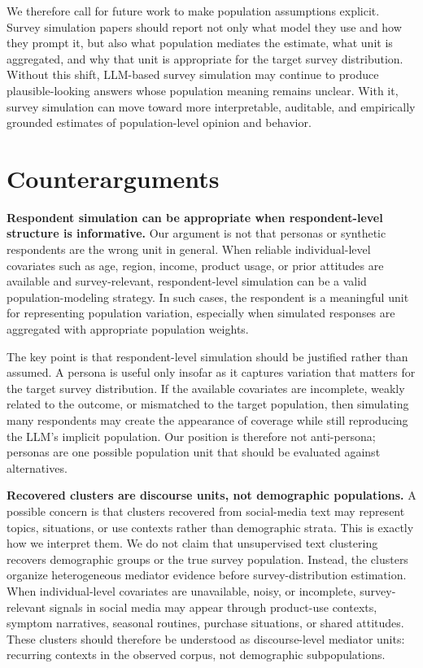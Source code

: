 \documentclass{article}
\begin{document}
We therefore call for future work to make population assumptions explicit.
Survey simulation papers should report not only what model they use and how they prompt it, but also what population mediates the estimate, what unit is aggregated, and why that unit is appropriate for the target survey distribution.
Without this shift, LLM-based survey simulation may continue to produce plausible-looking answers whose population meaning remains unclear.
With it, survey simulation can move toward more interpretable, auditable, and empirically grounded estimates of population-level opinion and behavior.

\section{Counterarguments}
\label{sec:counterarguments}

\textbf{Respondent simulation can be appropriate when respondent-level structure is informative.}
Our argument is not that personas or synthetic respondents are the wrong unit in general.
When reliable individual-level covariates such as age, region, income, product usage, or
prior attitudes are available and survey-relevant, respondent-level simulation can be a
valid population-modeling strategy. In such cases, the respondent is a meaningful unit
for representing population variation, especially when simulated responses are aggregated with appropriate population weights.

The key point is that respondent-level simulation should be justified rather than
assumed. A persona is useful only insofar as it captures variation that matters for the
target survey distribution. If the available covariates are incomplete, weakly related to
the outcome, or mismatched to the target population, then simulating many respondents may
create the appearance of coverage while still reproducing the LLM's implicit population.
Our position is therefore not anti-persona; personas are one possible population unit
that should be evaluated against alternatives.

\textbf{Recovered clusters are discourse units, not demographic populations.}
A possible concern is that clusters recovered from social-media text may represent topics,
situations, or use contexts rather than demographic strata. This is exactly how we interpret
them. We do not claim that unsupervised text clustering recovers demographic groups or the
true survey population. Instead, the clusters organize heterogeneous mediator evidence
before survey-distribution estimation. When individual-level covariates are unavailable, noisy, or incomplete, survey-relevant
signals in social media may appear through product-use contexts, symptom narratives,
seasonal routines, purchase situations, or shared attitudes. These clusters should therefore
be understood as discourse-level mediator units: recurring contexts in the observed corpus,
not demographic subpopulations.
\end{document}
